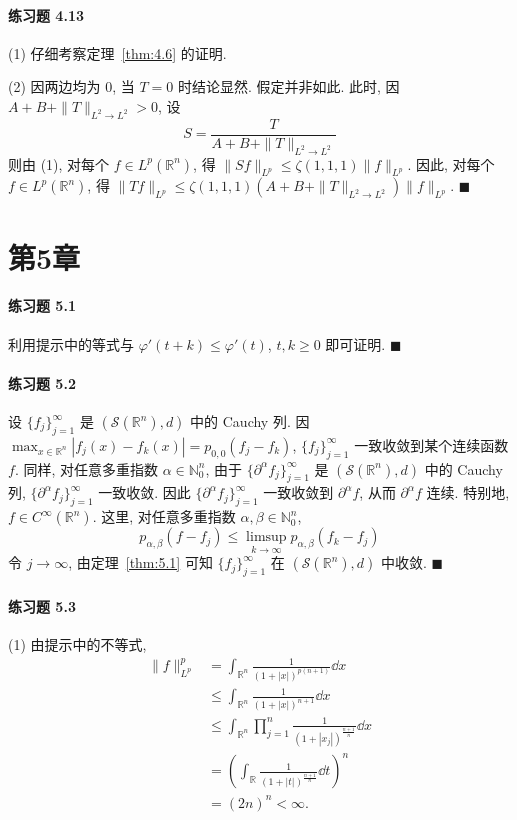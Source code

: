 \paragraph*{练习题 4.13}
(1) 仔细考察定理~\ref{thm:4.6} 的证明.

(2) 因两边均为 0, 当 $T = 0$ 时结论显然. 假定并非如此. 此时, 因 $A+B+\|T\|_{L^{2}\to L^{2}} > 0$, 设
\[
S = \frac{T}{A+B+\|T\|_{L^{2}\to L^{2}}}
\]
则由 (1), 对每个 $f \in L^{p}(\mathbb{R}^{n})$, 得 $\|Sf\|_{L^{p}} \leq \zeta(1,1,1)\|f\|_{L^{p}}$. 因此, 对每个 $f \in L^{p}(\mathbb{R}^{n})$, 得 $\|Tf\|_{L^{p}} \leq \zeta(1,1,1)(A+B+\|T\|_{L^{2}\to L^{2}})\|f\|_{L^{p}}$. $\blacksquare$

\section*{第5章}

\paragraph*{练习题 5.1}
利用提示中的等式与 $\varphi'(t+k) \leq \varphi'(t)$, $t, k \geq 0$ 即可证明. $\blacksquare$

\paragraph*{练习题 5.2}
设 $\{f_{j}\}_{j=1}^{\infty}$ 是 $(\mathcal{S}(\mathbb{R}^{n}), d)$ 中的 Cauchy 列. 因 $\max_{x\in\mathbb{R}^{n}}|f_{j}(x)-f_{k}(x)| = p_{0,0}(f_{j}-f_{k})$, $\{f_{j}\}_{j=1}^{\infty}$ 一致收敛到某个连续函数 $f$. 同样, 对任意多重指数 $\alpha \in \mathbb{N}_{0}^{n}$, 由于 $\{\partial^{\alpha}f_{j}\}_{j=1}^{\infty}$ 是 $(\mathcal{S}(\mathbb{R}^{n}), d)$ 中的 Cauchy 列, $\{\partial^{\alpha}f_{j}\}_{j=1}^{\infty}$ 一致收敛. 因此 $\{\partial^{\alpha}f_{j}\}_{j=1}^{\infty}$ 一致收敛到 $\partial^{\alpha}f$, 从而 $\partial^{\alpha}f$ 连续. 特别地, $f \in C^{\infty}(\mathbb{R}^{n})$. 这里, 对任意多重指数 $\alpha, \beta \in \mathbb{N}_{0}^{n}$,
\[
p_{\alpha,\beta}(f-f_{j}) \leq \limsup_{k \to \infty}p_{\alpha,\beta}(f_{k}-f_{j})
\]
令 $j \to \infty$, 由定理~\ref{thm:5.1} 可知 $\{f_{j}\}_{j=1}^{\infty}$ 在 $(\mathcal{S}(\mathbb{R}^{n}), d)$ 中收敛. $\blacksquare$

\paragraph*{练习题 5.3}
(1) 由提示中的不等式,
\begin{align*}
\|f\|_{L^{p}}^{p} &= \int_{\mathbb{R}^{n}}\frac{1}{(1+|x|)^{p(n+1)}}\dd x \\
&\leq \int_{\mathbb{R}^{n}}\frac{1}{(1+|x|)^{n+1}}\dd x \\
&\leq \int_{\mathbb{R}^{n}}\prod_{j=1}^{n}\frac{1}{(1+|x_{j}|)^{\frac{n+1}{n}}}\dd x \\
&= \left(\int_{\mathbb{R}}\frac{1}{(1+|t|)^{\frac{n+1}{n}}}\dd t\right)^{n} \\
&= (2n)^{n} < \infty.
\end{align*}

